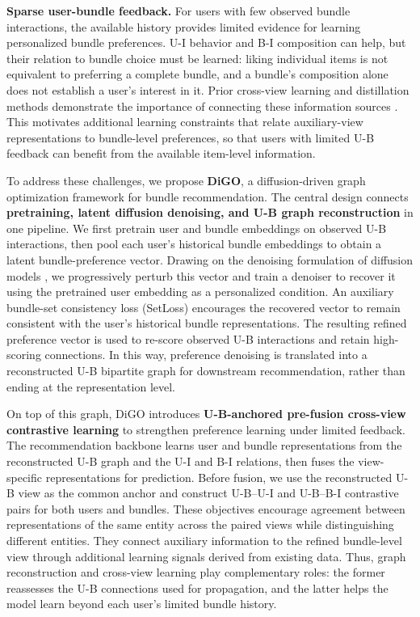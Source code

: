 \textbf{Sparse user-bundle feedback.} For users with few observed bundle interactions, the available history provides limited evidence for learning personalized bundle preferences. U-I behavior and B-I composition can help, but their relation to bundle choice must be learned: liking individual items is not equivalent to preferring a complete bundle, and a bundle's composition alone does not establish a user's interest in it. Prior cross-view learning and distillation methods demonstrate the importance of connecting these information sources \cite{ma2022crosscbr,ren2023dgmae}. This motivates additional learning constraints that relate auxiliary-view representations to bundle-level preferences, so that users with limited U-B feedback can benefit from the available item-level information.

To address these challenges, we propose \textbf{DiGO}, a diffusion-driven graph optimization framework for bundle recommendation. The central design connects \textbf{pretraining, latent diffusion denoising, and U-B graph reconstruction} in one pipeline. We first pretrain user and bundle embeddings on observed U-B interactions, then pool each user's historical bundle embeddings to obtain a latent bundle-preference vector. Drawing on the denoising formulation of diffusion models \cite{ho2020ddpm,wang2023diffrec}, we progressively perturb this vector and train a denoiser to recover it using the pretrained user embedding as a personalized condition. An auxiliary bundle-set consistency loss (SetLoss) encourages the recovered vector to remain consistent with the user's historical bundle representations. The resulting refined preference vector is used to re-score observed U-B interactions and retain high-scoring connections. In this way, preference denoising is translated into a reconstructed U-B bipartite graph for downstream recommendation, rather than ending at the representation level.

On top of this graph, DiGO introduces \textbf{U-B-anchored pre-fusion cross-view contrastive learning} to strengthen preference learning under limited feedback. The recommendation backbone learns user and bundle representations from the reconstructed U-B graph and the U-I and B-I relations, then fuses the view-specific representations for prediction. Before fusion, we use the reconstructed U-B view as the common anchor and construct U-B--U-I and U-B--B-I contrastive pairs for both users and bundles. These objectives encourage agreement between representations of the same entity across the paired views while distinguishing different entities. They connect auxiliary information to the refined bundle-level view through additional learning signals derived from existing data. Thus, graph reconstruction and cross-view learning play complementary roles: the former reassesses the U-B connections used for propagation, and the latter helps the model learn beyond each user's limited bundle history.

